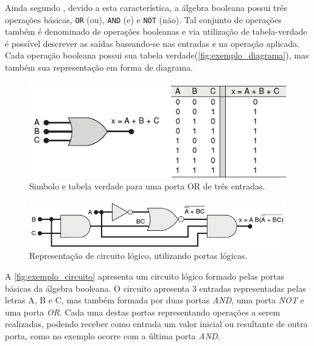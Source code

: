 \par
Ainda segundo \citeauthor{tocci2003sistemas}, devido a esta característica, a álgebra booleana possui três operações básicas, \texttt{OR} (ou), \texttt{AND} (e) e \texttt{NOT} (não). Tal conjunto de operações também é denominado de operações booleanas e via utilização de tabela-verdade é possível descrever as saídas baseando-se nas entradas e na operação aplicada. Cada operação booleana possui sua tabela verdade(\autoref{fig:exemplo_diagrama}), mas também sua representação em forma de diagrama.

\begin{figure}[htb]
	\begin{center}
    \caption{\label{fig:exemplo_diagrama}Simbolo e tabela verdade para uma porta OR de três entradas.}
	\includegraphics[scale=0.60]{Figuras/exemplo_diagrama.png}
	\end{center}
\end{figure}

\begin{figure}[htb]
	\begin{center}
    \caption{\label{fig:exemplo_circuito} Representação de circuito lógico, utilizando portas lógicas.}
	\includegraphics[scale=0.60]{Figuras/exemplo_circuito.png}
	\end{center}
\end{figure}

A \autoref{fig:exemplo_circuito} apresenta um circuito lógico formado pelas portas básicas da álgebra booleana. O circuito apresenta 3 entradas representadas pelas letras A, B e C, mas também formada por duas portas \textit{AND}, uma porta \textit{NOT} e uma porta \textit{OR}. Cada uma destas portas representando operações a serem realizadas, podendo receber como entrada um valor inicial ou resultante de outra porta, como no exemplo ocorre com a última porta \textit{AND}.

